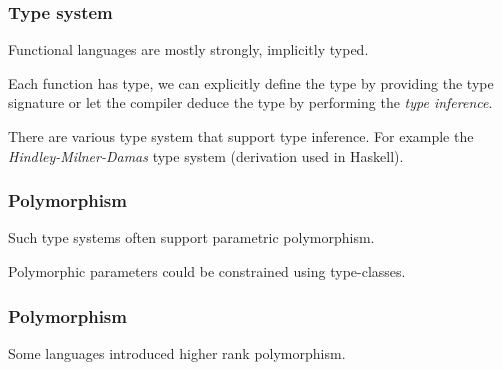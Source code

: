 \documentclass{beamer}
\newcommand{\vpad}{\vspace{5pt}}
\begin{document}

\begin{frame} \frametitle{Type system}
  Functional languages are mostly strongly, implicitly typed.

  \vpad
  Each function has type, we can explicitly define the type by providing the
  type signature or let the compiler deduce the type by performing the
  \textit{type inference}.
  \fplus

  There are various type system that support type inference. For example
  the \textit{Hindley-Milner-Damas} type system (derivation used in Haskell).

\end{frame}





\begin{frame} \frametitle{Polymorphism}
  Such type systems often support parametric polymorphism.
  \begin{block}{}
    \fpolylist
  \end{block}

  Polymorphic parameters could be constrained using type-classes.
  \begin{block}{}
    \fpolyfold
  \end{block}
\end{frame}

\begin{frame} \frametitle{Polymorphism}
  Some languages introduced higher rank polymorphism.
  \begin{block}{}
    \fpolyrankn
  \end{block}
\end{frame}
\end{document}
